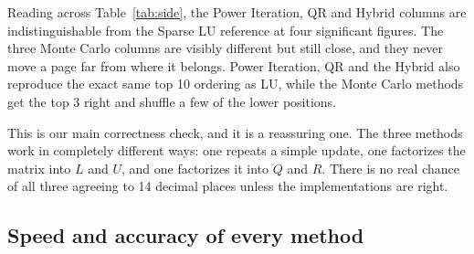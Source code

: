 \documentclass[11pt,a4paper]{article}
\begin{document}
Reading across Table~\ref{tab:side}, the Power Iteration, QR and Hybrid columns are
indistinguishable from the Sparse LU reference at four significant figures. The three
Monte Carlo columns are visibly different but still close, and they never move a page
far from where it belongs. Power Iteration, QR and the Hybrid also reproduce the exact
same top 10 ordering as LU, while the Monte Carlo methods get the top 3 right and
shuffle a few of the lower positions.

This is our main correctness check, and it is a reassuring one. The three methods
work in completely different ways: one repeats a simple update, one factorizes the
matrix into $L$ and $U$, and one factorizes it into $Q$ and $R$. There is no real
chance of all three agreeing to 14 decimal places unless the implementations are
right.

\subsection{Speed and accuracy of every method}

\begin{table}[H]
\centering
\caption{Accuracy and running time. Error is measured against Sparse LU, our reference
method. The $L_1$ error is the sum of absolute differences across all 281{,}903 pages.}
\label{tab:main}
\end{table}
\end{document}
